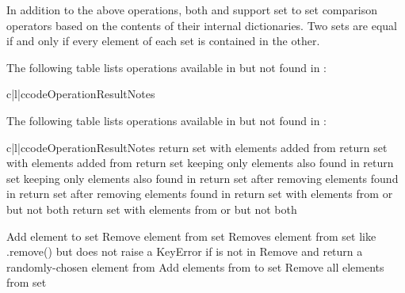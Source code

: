 In addition to the above operations, both  and 
support set to set comparison operators based on the contents of their
internal dictionaries.  Two sets are equal if and only if every element of
each set is contained in the other.

The following table lists operations available in 
but not found in :

\begin{tableiii}{c|l|c}{code}{Operation}{Result}{Notes}
\end{tableiii}

The following table lists operations available in 
but not found in :

\begin{tableiii}{c|l|c}{code}{Operation}{Result}{Notes}
          {return set  with elements added from }{}
          {return set  with elements added from }{}
          {return set  keeping only elements also found in }{}
          {return set  keeping only elements also found in }{}
          {return set  after removing elements found in }{}
          {return set  after removing elements found in }{}
          {return set  with elements from  or  but not both}{}
          {return set  with elements from  or  but not both}{}

  \hline
      {Add element  to set }{}
      {Remove element  from set }{}
      {Removes element  from set  like .remove()
       but does not raise a KeyError if  is not in }{}
      {Remove and return a randomly-chosen element from }{}
      {Add elements from  to set }{}
      {Remove all elements from set }{}
\end{tableiii}


